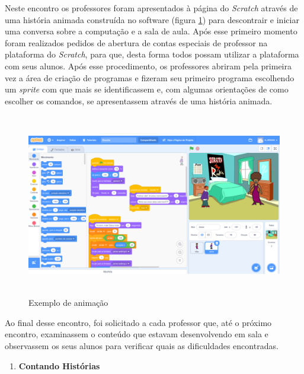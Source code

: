 \documentclass[12pt, openright, a4paper, brazil, english, french, spanish, bibjustif, openany, oneside]{abntex2}
\begin{document}
Neste encontro os professores foram apresentados à página do \textit{Scratch} através de uma história animada construída no software (figura \ref{exemploani4}) para descontrair e iniciar uma conversa sobre a computação e a sala de aula. Após esse primeiro momento foram realizados pedidos de abertura de contas especiais de professor na plataforma do \textit{Scratch}, para que, desta forma todos possam utilizar a plataforma com seus alunos. Após esse procedimento, os professores abriram pela primeira vez a área de criação de programas e fizeram seu primeiro programa escolhendo um \textit{sprite} com que mais se identificassem e, com algumas orientações de como escolher os comandos, se apresentassem através de uma história animada.



\begin{figure}[H]

    \center
    \caption{Exemplo de animação \label{exemploani4}}
    \includegraphics[height=8cm]{exemploani.png}
    
\end{figure}
 
Ao final desse encontro, foi solicitado a cada professor que, até o próximo encontro, examinassem o conteúdo que estavam desenvolvendo em sala e observassem os seus alunos para verificar quais as dificuldades encontradas.

\begin{enumerate}[resume,label=\textbf{\arabic*.}]

\item \textbf{Contando Histórias}

\end{enumerate}
\end{document}
